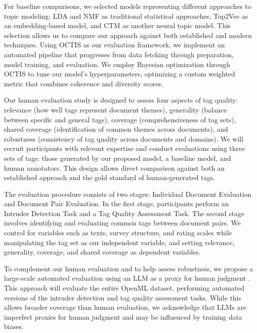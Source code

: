 For baseline comparisons, we selected models representing different approaches to topic modeling: LDA and NMF as traditional statistical approaches, Top2Vec as an embedding-based model, and CTM as another neural topic model. This selection allows us to compare our approach against both established and modern techniques. Using OCTIS \cite{terragni_octis_2021} as our evaluation framework, we implement an automated pipeline that progresses from data fetching through preparation, model training, and evaluation. We employ Bayesian optimization through OCTIS to tune our model's hyperparameters, optimizing a custom weighted metric that combines coherence and diversity scores.

Our human evaluation study is designed to assess four aspects of tag quality: relevance (how well tags represent document themes), generality (balance between specific and general tags), coverage (comprehensiveness of tag sets), shared coverage (identification of common themes across documents), and robustness (consistency of tag quality across documents and domains). We will recruit participants with relevant expertise and conduct evaluations using three sets of tags: those generated by our proposed model, a baseline model, and human annotators. This design allows direct comparison against both an established approach and the gold standard of human-generated tags.

The evaluation procedure consists of two stages: Individual Document Evaluation and Document Pair Evaluation. In the first stage, participants perform an Intruder Detection Task \cite{chang_reading_2009, newman_evaluating_2010, musil_exploring_2024, lau_machine_2014, bhatia_automatic_2017, hoyle_is_2021} and a Tag Quality Assessment Task. The second stage involves identifying and evaluating common tags between document pairs. We control for variables such as texts, survey structure, and rating scales while manipulating the tag set as our independent variable, and setting relevance, generality, coverage, and shared coverage as dependent variables.

To complement our human evaluation and to help assess robustness, we propose a large-scale automated evaluation using an LLM as a proxy for human judgment \cite{musil_exploring_2024}. This approach will evaluate the entire OpenML dataset, performing automated versions of the intruder detection and tag quality assessment tasks. While this allows broader coverage than human evaluation, we acknowledge that LLMs are imperfect proxies for human judgment and may be influenced by training data biases.


